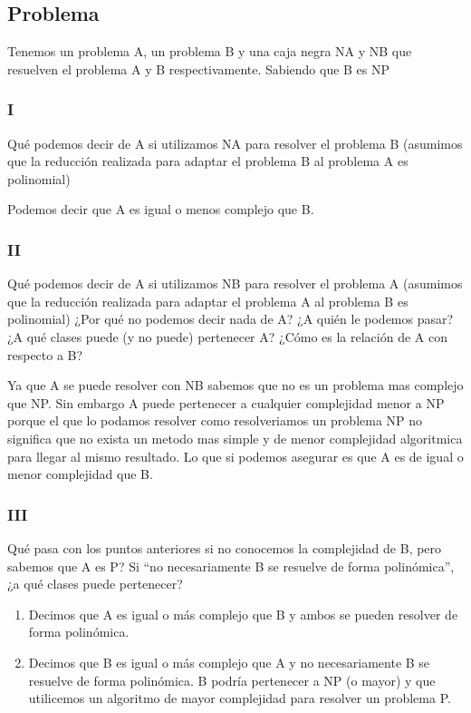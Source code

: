
\subsection{Problema}
Tenemos un problema A, un problema B y una caja negra NA y NB que resuelven el problema A y B respectivamente. Sabiendo que B es NP
\subsubsection{I}
Qué podemos decir de A si utilizamos NA para resolver el problema B (asumimos que la reducción realizada para adaptar el problema B al problema A es polinomial)\newline

Podemos decir que A es igual o menos complejo que B.
\subsubsection{II}
Qué podemos decir de A si utilizamos NB para resolver el problema A (asumimos que la reducción realizada para adaptar el problema A al problema B es polinomial)\newline
¿Por qué no podemos decir nada de A? ¿A quién le podemos pasar? ¿A qué clases puede (y no puede) pertenecer A? ¿Cómo es la relación de A con respecto a B?\newline

Ya que A se puede resolver con NB sabemos que no es un problema mas complejo que NP. Sin embargo A puede pertenecer a cualquier complejidad menor a NP porque el que lo podamos resolver como  resolveriamos un problema NP no significa que no exista un metodo mas simple y de menor complejidad algoritmica para llegar al mismo resultado. Lo que si podemos asegurar es que A es de igual o menor complejidad que B.


\subsubsection{III}
Qué pasa con los puntos anteriores si no conocemos la complejidad de B, pero sabemos que A es P?\newline
Si “no necesariamente B se resuelve de forma polinómica”, ¿a qué clases puede pertenecer?

\begin{enumerate}
    \item Decimos que A es igual o más complejo que B y ambos se pueden resolver de forma polinómica.
    \item Decimos que B es igual o más complejo que A y no necesariamente B se resuelve de forma polinómica. B podría pertenecer a NP (o mayor) y que utilicemos un algoritmo de mayor complejidad para resolver un problema P.
\end{enumerate}

